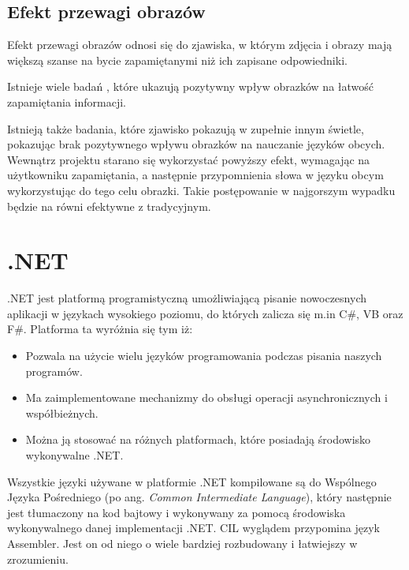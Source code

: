 \section{Efekt przewagi obrazów}

Efekt przewagi obrazów odnosi się do zjawiska, w którym zdjęcia i obrazy mają większą szanse na bycie zapamiętanymi niż ich zapisane odpowiedniki. 

Istnieje wiele badań \cite{PicturesRocks}\cite{SuperPictures}, które ukazują pozytywny wpływ obrazków na łatwość zapamiętania informacji. 

Istnieją także badania, które zjawisko pokazują w zupełnie innym świetle, pokazując brak pozytywnego wpływu obrazków na nauczanie języków obcych\cite{OverConfidence}.
\\
Wewnątrz projektu starano się wykorzystać powyższy efekt, wymagając na użytkowniku zapamiętania, a następnie przypomnienia słowa w języku obcym wykorzystując do tego celu obrazki. Takie postępowanie w najgorszym wypadku będzie na równi efektywne z tradycyjnym.







{\let\cleardoublepage\relax \chapter{.NET}}


.NET jest platformą programistyczną umożliwiającą pisanie nowoczesnych aplikacji w językach wysokiego poziomu, do których zalicza się m.in C\#, VB oraz F\#. Platforma ta wyróżnia się tym iż:
\begin{itemize}
	\item Pozwala na użycie wielu języków programowania podczas pisania naszych programów.
	\item Ma zaimplementowane mechanizmy do obsługi operacji asynchronicznych i współbieżnych.
	\item Można ją stosować na różnych platformach, które posiadają środowisko wykonywalne .NET.
\end{itemize}
Wszystkie języki używane w platformie .NET kompilowane są do Wspólnego Języka Pośredniego (po ang. \textit{Common Intermediate Language}), który następnie jest tłumaczony na kod bajtowy i wykonywany za pomocą środowiska wykonywalnego danej implementacji .NET. CIL wyglądem przypomina język Assembler. Jest on od niego o wiele bardziej rozbudowany i łatwiejszy w zrozumieniu.

